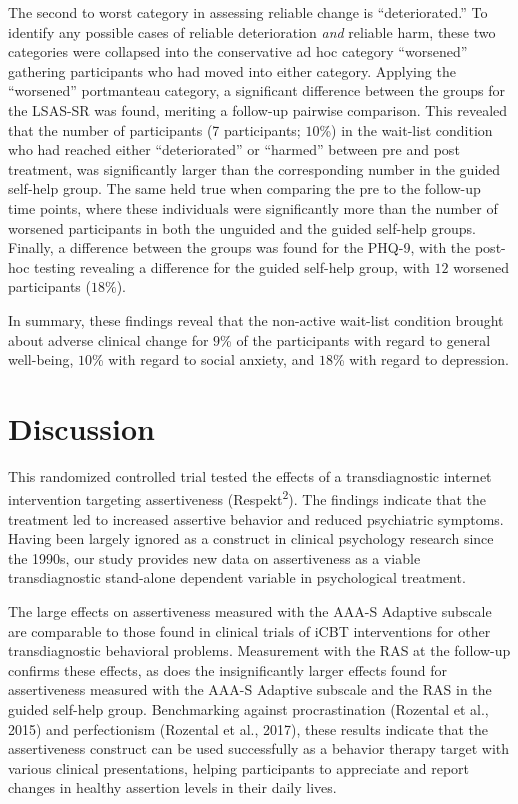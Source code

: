 \documentclass[3p]{elsarticle} %
\begin{document}
The second to worst category in assessing reliable change is
``deteriorated.'' To identify any possible cases of reliable
deterioration \emph{and} reliable harm, these two categories were
collapsed into the conservative ad hoc category ``worsened'' gathering
participants who had moved into either category. Applying the
``worsened'' portmanteau category, a significant difference between the
groups for the LSAS-SR was found, meriting a follow-up pairwise
comparison. This revealed that the number of participants (7
participants; \(10\)\%) in the wait-list condition who had reached
either ``deteriorated'' or ``harmed'' between pre and post treatment,
was significantly larger than the corresponding number in the guided
self-help group. The same held true when comparing the pre to the
follow-up time points, where these individuals were significantly more
than the number of worsened participants in both the unguided and the
guided self-help groups. Finally, a difference between the groups was
found for the PHQ-9, with the post-hoc testing revealing a difference
for the guided self-help group, with \(12\) worsened participants
(\(18\)\%).

In summary, these findings reveal that the non-active wait-list
condition brought about adverse clinical change for \(9\)\% of the
participants with regard to general well-being, \(10\)\% with regard to
social anxiety, and \(18\)\% with regard to depression.

\hypertarget{discussion}{%
\section{Discussion}\label{discussion}}

This randomized controlled trial tested the effects of a transdiagnostic
internet intervention targeting assertiveness
(Respekt\textsuperscript{2}). The findings indicate that the treatment
led to increased assertive behavior and reduced psychiatric symptoms.
Having been largely ignored as a construct in clinical psychology
research since the 1990s, our study provides new data on assertiveness
as a viable transdiagnostic stand-alone dependent variable in
psychological treatment.

The large effects on assertiveness measured with the AAA-S Adaptive
subscale are comparable to those found in clinical trials of iCBT
interventions for other transdiagnostic behavioral problems. Measurement
with the RAS at the follow-up confirms these effects, as does the
insignificantly larger effects found for assertiveness measured with the
AAA-S Adaptive subscale and the RAS in the guided self-help group.
Benchmarking against procrastination (Rozental et al., 2015) and
perfectionism (Rozental et al., 2017), these results indicate that the
assertiveness construct can be used successfully as a behavior therapy
target with various clinical presentations, helping participants to
appreciate and report changes in healthy assertion levels in their daily
lives.
\end{document}
